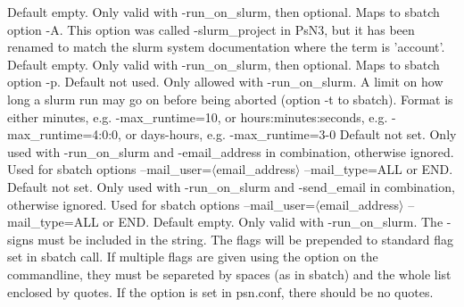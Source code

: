 \begin{optionlist}
\nextopt
{}
Default empty. Only valid with -run\_on\_slurm, then optional. Maps to sbatch option -A. This option was called -slurm\_project in PsN3, but it has been renamed to match the slurm system documentation where the term is 'account'.
\nextopt
{}
Default empty. Only valid with -run\_on\_slurm, then optional. Maps to sbatch option -p.
\nextopt
{}
Default not used. Only allowed with -run\_on\_slurm. A limit on how long a slurm run may go on before being aborted (option -t to sbatch). Format is either minutes, e.g. -max\_runtime=10, or hours:minutes:seconds, e.g. -max\_runtime=4:0:0, or days-hours, e.g. -max\_runtime=3-0 
\nextopt
{}
Default not set. Only used with -run\_on\_slurm and -email\_address in combination, otherwise ignored. Used for sbatch options --mail\_user=$\langle$email\_address$\rangle$ --mail\_type=ALL or END.  
\nextopt
{}
Default not set. Only used with -run\_on\_slurm and -send\_email in combination, otherwise ignored. Used for sbatch options --mail\_user=$\langle$email\_address$\rangle$ --mail\_type=ALL or END.  
\nextopt
{}
Default empty. Only valid with -run\_on\_slurm. The - signs must be included in the string. The flags will be prepended to standard flag set in sbatch call. If multiple flags are given using the option on the commandline, they must be separeted by spaces (as in sbatch) and the whole list enclosed by quotes. If the option is set in psn.conf, there should be no quotes. 
\nextopt
\end{optionlist}



